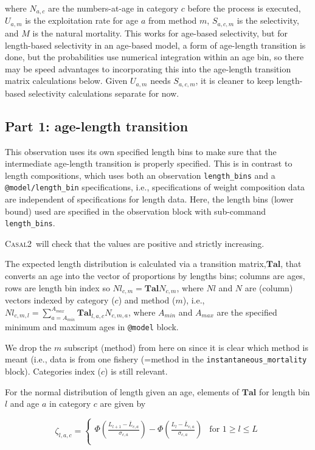 \documentclass[a4paper,11pt,twoside,pdftex,draft]{article}
\newcommand{\CNAME}{\textsc{Casal2}}
\begin{document}
where $N_{a,c}$ are the numbers-at-age in category $c$ before the process is executed, $U_{a,m}$ is the exploitation rate for age $a$ from method $m$, $S_{a,c,m}$ is the selectivity, and $M$ is the natural mortality. This works for age-based selectivity, but for length-based selectivity in an age-based model, a form of age-length transition is done, but the probabilities use numerical integration within an age bin, so there may be speed advantages to incorporating this into the age-length transition matrix calculations below. Given $U_{a,m}$ needs $S_{a,c,m} $, it is cleaner to keep length-based selectivity calculations separate for now.




\subsection{Part 1: age-length transition}
This observation uses its own specified length bins to make sure that the intermediate age-length transition is properly specified. This is in contrast to length compositions, which uses both an observation \texttt{length\_bins} and a  \texttt{@model/length\_bin}  specifications, i.e., specifications of weight composition data are independent of specifications for length data. Here, the length bins (lower bound) used are specified in the observation block with sub-command \texttt{length\_bins}.

\CNAME~will check that the values are positive and strictly increasing. 

The expected length distribution is calculated via 
a transition matrix,$\mathbf{Tal}$, that converts an age into the vector of proportions by lengths bins; columns are ages, rows are length bin index so $Nl_{c,m} = \mathbf{Tal} N_{c,m}$, where $Nl$ and $N$ are (column) vectors indexed by category ($c$) and method ($m$), i.e.,
$Nl_{c,m,l} = \sum_{a=A_{min}}^{A_{max}}  \mathbf{Tal}_{l,a,c} N_{c,m,a}$, where $A_{min}$ and $A_{max}$ are the specified minimum and maximum ages in \texttt{@model} block.

We drop the $m$ subscript (method) from here on since it is clear which method is meant (i.e., data is from one fishery (=method in the \texttt{instantaneous\_mortality} block). Categories index ($c$) is still relevant.

For the normal distribution of length given an age, 
elements of $\mathbf{Tal}$ for length bin $l$ and age $a$ in category $c$ are given by

\begin{equation}
\zeta_{l,a,c} =
\begin{cases}

\Phi\left( \frac{L_{l+1} - \bar L_{c,a}   }{\sigma_{c,a}} \right) - \Phi\left( \frac{L_{l} - \bar L_{c,a}   }{\sigma_{c,a}} \right) & \text{for } 1 \geq l \leq L \\

\end{cases}
\end{equation}
\end{document}
